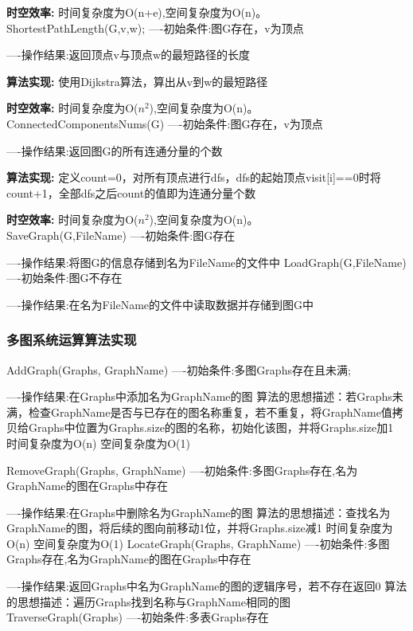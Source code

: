 \documentclass[supercite]{Experimental_Report}
\theoremstyle{definition}
\begin{document}
\textbf{时空效率: }时间复杂度为O(n+e),空间复杂度为O(n)。\\
ShortestPathLength(G,v,w);
----初始条件:图G存在，v为顶点

----操作结果:返回顶点v与顶点w的最短路径的长度

\textbf{算法实现: }使用Dijkstra算法，算出从v到w的最短路径

\textbf{时空效率: }时间复杂度为O($n^{2}$),空间复杂度为O(n)。\\
ConnectedComponentsNums(G)
----初始条件:图G存在，v为顶点

----操作结果:返回图G的所有连通分量的个数

\textbf{算法实现: }定义count=0，对所有顶点进行dfs，dfs的起始顶点visit[i]==0时将count+1，全部dfs之后count的值即为连通分量个数

\textbf{时空效率: }时间复杂度为O($n^{2}$),空间复杂度为O(n)。\\
SaveGraph(G,FileName)
----初始条件:图G存在

----操作结果:将图G的信息存储到名为FileName的文件中
LoadGraph(G,FileName)
----初始条件:图G不存在

----操作结果:在名为FileName的文件中读取数据并存储到图G中
\subsubsection{多图系统运算算法实现}
AddGraph(Graphs, GraphName)
----初始条件:多图Graphs存在且未满;

----操作结果:在Graphs中添加名为GraphName的图
算法的思想描述：若Graphs未满，检查GraphName是否与已存在的图名称重复，若不重复，将GraphName值拷贝给Graphs中位置为Graphs.size的图的名称，初始化该图，并将Graphs.size加1
时间复杂度为O(n)
空间复杂度为O(1)

RemoveGraph(Graphs, GraphName)
----初始条件:多图Graphs存在,名为GraphName的图在Graphs中存在

----操作结果:在Graphs中删除名为GraphName的图
算法的思想描述：查找名为GraphName的图，将后续的图向前移动1位，并将Graphs.size减1
时间复杂度为O(n)
空间复杂度为O(1)
LocateGraph(Graphs, GraphName)
----初始条件:多图Graphs存在,名为GraphName的图在Graphs中存在

----操作结果:返回Graphs中名为GraphName的图的逻辑序号，若不存在返回0
算法的思想描述：遍历Graphs找到名称与GraphName相同的图
TraverseGraph(Graphs)
----初始条件:多表Graphs存在
\end{document}
